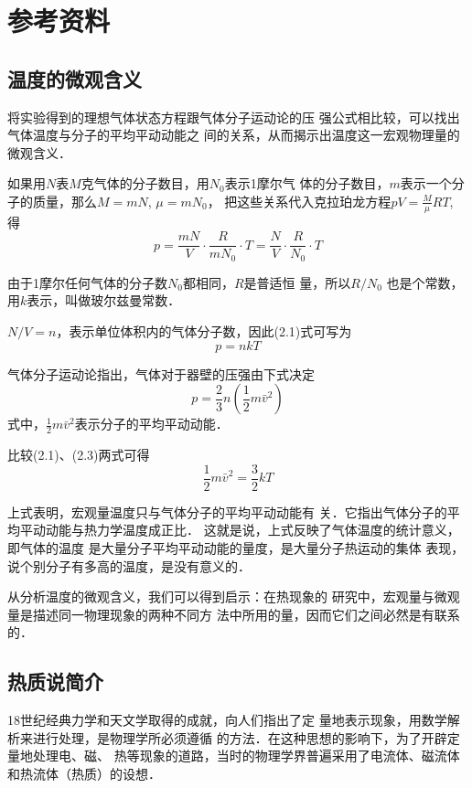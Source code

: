 \section{参考资料}
\subsection{温度的微观含义}
将实验得到的理想气体状态方程跟气体分子运动论的压
强公式相比较，可以找出气体温度与分子的平均平动动能之
间的关系，从而揭示出温度这一宏观物理量的微观含义．

如果用$N$表$M$克气体的分子数目，用$N_0$表示1摩尔气
体的分子数目，$m$表示一个分子的质量，那么$M=mN$, $\mu=mN_0$，
把这些关系代入克拉珀龙方程$pV=\frac{M}{\mu}RT$, 得
\begin{equation}
    p=\frac{mN}{V}\cdot \frac{R}{mN_0}\cdot T=\frac{N}{V}\cdot \frac{R}{N_0}\cdot T
\end{equation}

由于1摩尔任何气体的分子数$N_0$都相同，$R$是普适恒
量，所以$R/N_0$
也是个常数，用$k$表示，叫做玻尔兹曼常数．

$N/V=n$，表示单位体积内的气体分子数，因此(2.1)式可写为
\begin{equation}
    p=nkT
\end{equation}

气体分子运动论指出，气体对于器壁的压强由下式决定
\begin{equation}
    p=\frac{2}{3}n\left(\frac{1}{2}m\bar{v}^2\right)
\end{equation}
式中，$\frac{1}{2}m\bar{v}^2$表示分子的平均平动动能．

比较(2.1)、(2.3)两式可得
\[\frac{1}{2}m\bar{v}^2=\frac{3}{2}kT\]

上式表明，宏观量温度只与气体分子的平均平动动能有
关．它指出气体分子的平均平动动能与热力学温度成正比．
这就是说，上式反映了气体温度的统计意义，即气体的温度
是大量分子平均平动动能的量度，是大量分子热运动的集体
表现，说个别分子有多高的温度，是没有意义的．

从分析温度的微观含义，我们可以得到启示：在热现象的
研究中，宏观量与微观量是描述同一物理现象的两种不同方
法中所用的量，因而它们之间必然是有联系的．

\subsection{热质说简介}

18世纪经典力学和天文学取得的成就，向人们指出了定
量地表示现象，用数学解析来进行处理，是物理学所必须遵循
的方法．在这种思想的影响下，为了开辟定量地处理电、磁、
热等现象的道路，当时的物理学界普遍采用了电流体、磁流体
和热流体（热质）的设想．

